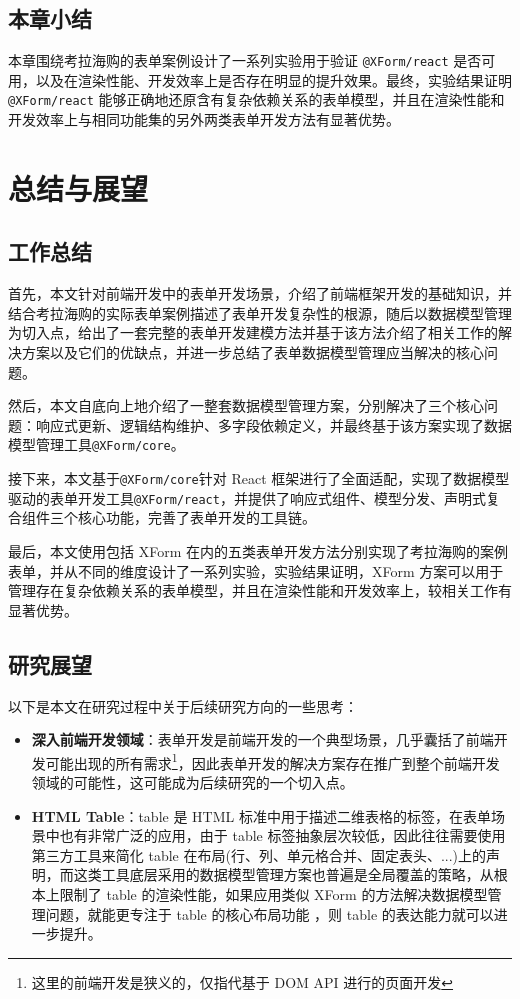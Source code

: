 \documentclass[winfonts,master,twoside]{njuthesis}
\makeatletter
\newcommand{\xform}[1]{\texttt{@XForm/#1}}
\makeatother
\begin{document}
\section{本章小结}

本章围绕考拉海购的表单案例设计了一系列实验用于验证 \xform{react} 是否可用，以及在渲染性能、开发效率上是否存在明显的提升效果。最终，实验结果证明 \xform{react} 能够正确地还原含有复杂依赖关系的表单模型，并且在渲染性能和开发效率上与相同功能集的另外两类表单开发方法有显著优势。

\chapter{总结与展望}

\section{工作总结}

首先，本文针对前端开发中的表单开发场景，介绍了前端框架开发的基础知识，并结合考拉海购的实际表单案例描述了表单开发复杂性的根源，随后以数据模型管理为切入点，给出了一套完整的表单开发建模方法并基于该方法介绍了相关工作的解决方案以及它们的优缺点，并进一步总结了表单数据模型管理应当解决的核心问题。

然后，本文自底向上地介绍了一整套数据模型管理方案，分别解决了三个核心问题：响应式更新、逻辑结构维护、多字段依赖定义，并最终基于该方案实现了数据模型管理工具\xform{core}。

接下来，本文基于\xform{core}针对 React 框架进行了全面适配，实现了数据模型驱动的表单开发工具\xform{react}，并提供了响应式组件、模型分发、声明式复合组件三个核心功能，完善了表单开发的工具链。

最后，本文使用包括 XForm 在内的五类表单开发方法分别实现了考拉海购的案例表单，并从不同的维度设计了一系列实验，实验结果证明，XForm 方案可以用于管理存在复杂依赖关系的表单模型，并且在渲染性能和开发效率上，较相关工作有显著优势。

\section{研究展望}

以下是本文在研究过程中关于后续研究方向的一些思考：

\begin{itemize}
    \item \textbf{深入前端开发领域}：表单开发是前端开发的一个典型场景，几乎囊括了前端开发可能出现的所有需求\footnote{这里的前端开发是狭义的，仅指代基于 DOM API 进行的页面开发}，因此表单开发的解决方案存在推广到整个前端开发领域的可能性，这可能成为后续研究的一个切入点。
    \item \textbf{HTML Table}：table 是 HTML 标准中用于描述二维表格的标签，在表单场景中也有非常广泛的应用，由于 table 标签抽象层次较低，因此往往需要使用第三方工具来简化 table 在布局(行、列、单元格合并、固定表头、...)上的声明，而这类工具底层采用的数据模型管理方案也普遍是全局覆盖的策略，从根本上限制了 table 的渲染性能，如果应用类似 XForm 的方法解决数据模型管理问题，就能更专注于 table 的核心布局功能
          ，则 table 的表达能力就可以进一步提升。
\end{itemize}
\end{document}
